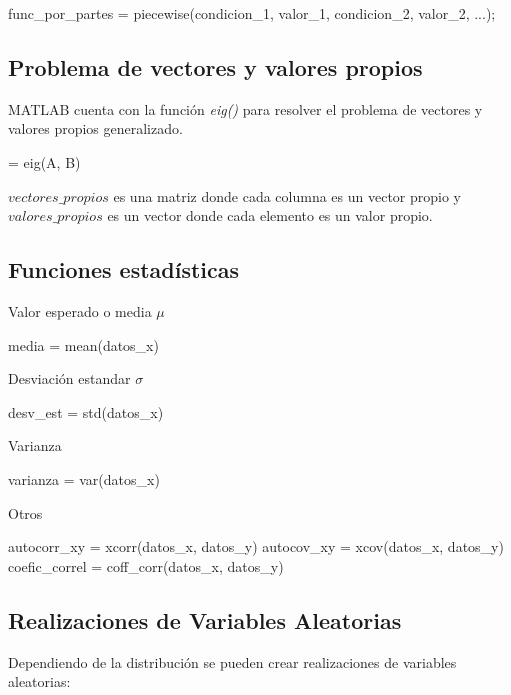 \begin{verbatimg}
    func_por_partes = piecewise(condicion_1, valor_1, condicion_2, valor_2, ...);
\end{verbatimg}

\subsection{Problema de vectores y valores propios}
MATLAB cuenta con la función \emph{eig()} para resolver el problema de vectores y valores propios generalizado.

\begin{verbatimg}
     = eig(A, B)
\end{verbatimg}

\noindent $vectores\_propios$ es una matriz donde cada columna es un vector propio y $valores\_propios$ es un vector donde cada elemento es un valor propio.

\subsection{Funciones estadísticas}
Valor esperado o media $\mu$
\begin{verbatimg}
    media = mean(datos_x)
\end{verbatimg}

Desviación estandar $\sigma$
\begin{verbatimg}
    desv_est = std(datos_x)
\end{verbatimg}

Varianza
\begin{verbatimg}
    varianza = var(datos_x)
\end{verbatimg}

Otros
\begin{verbatimg}
    autocorr_xy = xcorr(datos_x, datos_y) %
    autocov_xy = xcov(datos_x, datos_y) %
    coefic_correl = coff_corr(datos_x, datos_y)
\end{verbatimg}

\subsection{Realizaciones de Variables Aleatorias}
Dependiendo de la distribución se pueden crear realizaciones de variables aleatorias: \\

